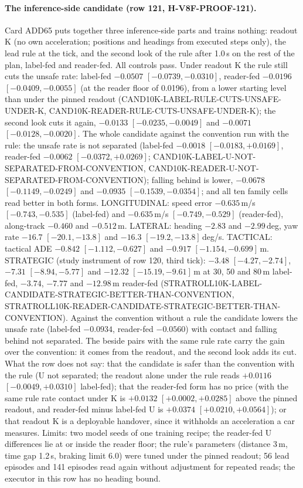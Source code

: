 \paragraph{The inference-side candidate (row 121, H-V8F-PROOF-121).} Card ADD65 puts together three inference-side parts and trains nothing: readout K (no own acceleration; positions and headings from executed steps only), the lead rule at the tick, and the second look of the rule after 1.0\,s on the rest of the plan, label-fed and reader-fed. All controls pass. Under readout K the rule still cuts the unsafe rate: label-fed $-0.0507$ $[-0.0739,-0.0310]$, reader-fed $-0.0196$ $[-0.0409,-0.0055]$ (at the reader floor of 0.0196), from a lower starting level than under the pinned readout (CAND10K-LABEL-RULE-CUTS-UNSAFE-UNDER-K, CAND10K-READER-RULE-CUTS-UNSAFE-UNDER-K); the second look cuts it again, $-0.0133$ $[-0.0235,-0.0049]$ and $-0.0071$ $[-0.0128,-0.0020]$. The whole candidate against the convention run with the rule: the unsafe rate is not separated (label-fed $-0.0018$ $[-0.0183,+0.0169]$, reader-fed $-0.0062$ $[-0.0372,+0.0269]$; CAND10K-LABEL-U-NOT-SEPARATED-FROM-CONVENTION, CAND10K-READER-U-NOT-SEPARATED-FROM-CONVENTION); falling behind is lower, $-0.0678$ $[-0.1149,-0.0249]$ and $-0.0935$ $[-0.1539,-0.0354]$; and all ten family cells read better in both forms. LONGITUDINAL: speed error $-0.635$\,m/s $[-0.743,-0.535]$ (label-fed) and $-0.635$\,m/s $[-0.749,-0.529]$ (reader-fed), along-track $-0.460$ and $-0.512$\,m. LATERAL: heading $-2.83$ and $-2.99$\,deg, yaw rate $-16.7$ $[-20.1,-13.8]$ and $-16.3$ $[-19.2,-13.8]$\,deg/s. TACTICAL: tactical ADE $-0.842$ $[-1.112,-0.627]$ and $-0.917$ $[-1.154,-0.699]$\,m. STRATEGIC (study instrument of row 120, third tick): $-3.48$ $[-4.27,-2.74]$, $-7.31$ $[-8.94,-5.77]$ and $-12.32$ $[-15.19,-9.61]$\,m at 30, 50 and 80\,m label-fed, $-3.74$, $-7.77$ and $-12.98$\,m reader-fed (STRATROLL10K-LABEL-CANDIDATE-STRATEGIC-BETTER-THAN-CONVENTION, STRATROLL10K-READER-CANDIDATE-STRATEGIC-BETTER-THAN-CONVENTION). Against the convention without a rule the candidate lowers the unsafe rate (label-fed $-0.0934$, reader-fed $-0.0560$) with contact and falling behind not separated. The beside pairs with the same rule rate carry the gain over the convention: it comes from the readout, and the second look adds its cut. What the row does not say: that the candidate is safer than the convention with the rule (U not separated; the readout alone under the rule reads $+0.0116$ $[-0.0049,+0.0310]$ label-fed); that the reader-fed form has no price (with the same rule rate contact under K is $+0.0132$ $[+0.0002,+0.0285]$ above the pinned readout, and reader-fed minus label-fed U is $+0.0374$ $[+0.0210,+0.0564]$); or that readout K is a deployable handover, since it withholds an acceleration a car measures. Limits: two model seeds of one training recipe; the reader-fed U differences lie at or inside the reader floor; the rule's parameters (distance 3\,m, time gap 1.2\,s, braking limit 6.0) were tuned under the pinned readout; 56 lead episodes and 141 episodes read again without adjustment for repeated reads; the executor in this row has no heading bound.

